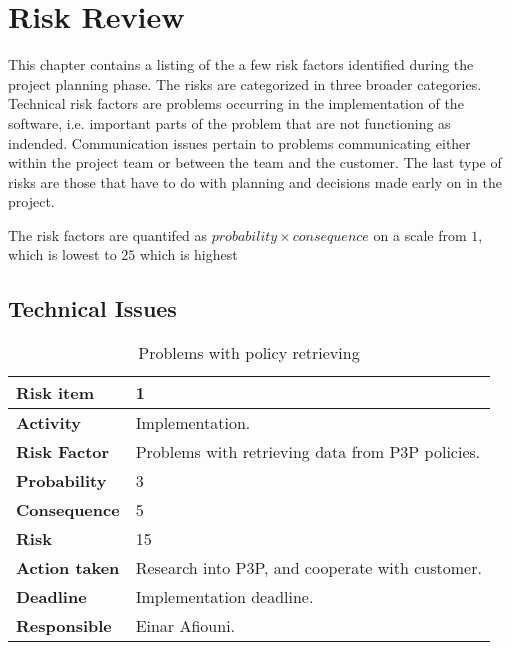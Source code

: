 \chapter{Risk Review}\label{riskAppendix}

\minitoc


This chapter contains a listing of the a few risk factors identified during the project planning phase. The risks are categorized in three broader categories. Technical risk factors are problems occurring in the implementation of the software, i.e. important parts of the problem that are not functioning as indended. Communication issues pertain to problems communicating either within the project team or between the team and the customer. The last type of risks are those that have to do with planning and decisions made early on in the project.

The risk factors are quantifed as $probability \times consequence$ on a scale from $1$, which is lowest to $25$ which is highest


\section{Technical Issues}


\begin{table}[htdp]

\begin{center}
\begin{tabularx}{\textwidth}{| X | X |}
\hline
\textbf{Risk item} & 1 \\
\hline
\textbf{Activity} & Implementation.  \\
\hline
\textbf{Risk Factor} & Problems with retrieving data from P3P policies. \\
\hline
\textbf{Probability} & 3 \\
\hline
\textbf{Consequence} & 5 \\
\hline
\textbf{Risk} & 15 \\
\hline
\textbf{Action taken} & Research into P3P, and cooperate with \newline customer. \\
\hline
\textbf{Deadline} & Implementation deadline. \\
\hline
\textbf{Responsible} & Einar Afiouni. \\
\hline
\end{tabularx}
\caption{Problems with policy retrieving}
\end{center}
\label{risk_3}
\end{table}


